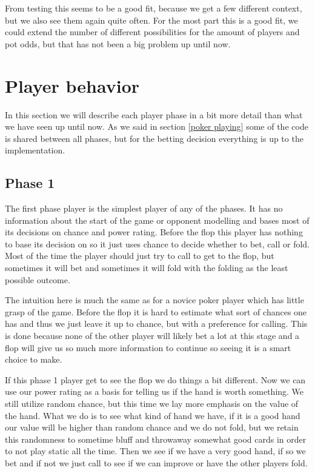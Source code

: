 \documentclass[titlepage, a4paper]{article}
\begin{document}
From testing this seems to be a good fit, because we get a few different context, but
we also see them again quite often. For the most part this is a good fit, we could
extend the number of different possibilities for the amount of players and pot odds, but
that has not been a big problem up until now.

\section{Player behavior}\label{player behavior}
In this section we will describe each player phase in a bit more detail than what
we have seen up until now. As we said in section \ref{poker playing} some of the
code is shared between all phases, but for the betting decision everything is
up to the implementation.

\subsection{Phase 1}\label{phase 1 player}
The first phase player is the simplest player of any of the phases. It has no 
information about the start of the game or opponent modelling and bases most
of its decisions on chance and power rating. Before the flop this player
has nothing to base its decision on so it just uses chance to decide whether
to bet, call or fold. Most of the time the player should just try to call to
get to the flop, but sometimes it will bet and sometimes it will fold with the folding
as the least possible outcome.

The intuition here is much the same as for a novice poker player which has little
grasp of the game. Before the flop it is hard to estimate what sort of chances
one has and thus we just leave it up to chance, but with a preference for calling.
This is done because none of the other player will likely bet a lot at this stage
and a flop will give us so much more information to continue so seeing it is a 
smart choice to make.

If this phase 1 player get to see the flop we do things a bit different. Now we
can use our power rating as a basis for telling us if the hand is worth something.
We still utilize random chance, but this time we lay more emphasis on the value
of the hand. What we do is to see what kind of hand we have, if it is a good hand
our value will be higher than random chance and we do not fold, but we retain this
randomness to sometime bluff and throwaway somewhat good cards in order to not
play static all the time. Then we see if we have a very good hand, if so we bet and
if not we just call to see if we can improve or have the other players fold.
\end{document}
